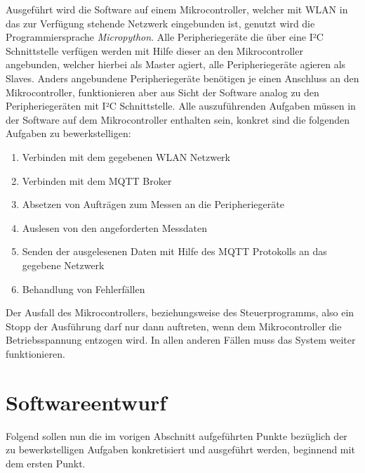 \documentclass[a4paper, 12pt]{article}
\begin{document}
Ausgeführt wird die Software auf einem Mikrocontroller, welcher mit WLAN in das zur Verfügung stehende Netzwerk eingebunden ist, genutzt wird die Programmiersprache \textit{Micropython}. Alle Peripheriegeräte die über eine I²C Schnittstelle verfügen werden mit Hilfe dieser an den Mikrocontroller angebunden, welcher hierbei als Master agiert, alle Peripheriegeräte agieren als Slaves. Anders angebundene Peripheriegeräte benötigen je einen Anschluss an den Mikrocontroller, funktionieren aber aus Sicht der Software analog zu den Peripheriegeräten mit I²C Schnittstelle. Alle auszuführenden Aufgaben müssen in der Software auf dem Mikrocontroller enthalten sein, konkret sind die folgenden Aufgaben zu bewerkstelligen:
\begin{enumerate}
\item Verbinden mit dem gegebenen WLAN Netzwerk
\item Verbinden mit dem MQTT Broker
\item Absetzen von Aufträgen zum Messen an die Peripheriegeräte
\item Auslesen von den angeforderten Messdaten
\item Senden der ausgelesenen Daten mit Hilfe des MQTT Protokolls an das gegebene Netzwerk
\item Behandlung von Fehlerfällen
\end{enumerate}
Der Ausfall des Mikrocontrollers, beziehungsweise des Steuerprogramms, also ein Stopp der Ausführung darf nur dann auftreten, wenn dem Mikrocontroller die Betriebsspannung entzogen wird. In allen anderen Fällen muss das System weiter funktionieren.


\section{Softwareentwurf}
Folgend sollen nun die im vorigen Abschnitt aufgeführten Punkte bezüglich der zu bewerkstelligen Aufgaben konkretisiert und ausgeführt werden, beginnend mit dem ersten Punkt.
\end{document}
